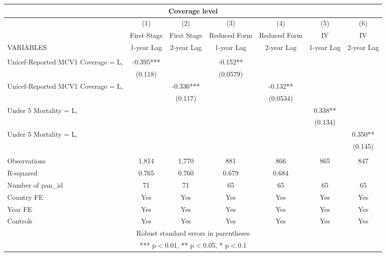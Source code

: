 \documentclass[]{article}
\begin{document}
\begin{tabular}{lcccccc}
\multicolumn{7}{c}{Coverage level} \\ \hline
 & (1) & (2) & (3) & (4) & (5) & (6) \\
 & First Stage & First Stage & Reduced Form & Reduced Form & IV & IV \\
VARIABLES & 1-year Lag & 2-year Lag & 1-year Lag & 2-year Lag & 1-year Lag & 2-year Lag \\ \hline
 &  &  &  &  &  &  \\
Unicef-Reported MCV1 Coverage = L, & -0.395*** &  & -0.152** &  &  &  \\
 & (0.118) &  & (0.0579) &  &  &  \\
Unicef-Reported MCV1 Coverage = L, &  & -0.336*** &  & -0.132** &  &  \\
 &  & (0.117) &  & (0.0534) &  &  \\
Under 5 Mortality = L, &  &  &  &  & 0.338** &  \\
 &  &  &  &  & (0.134) &  \\
Under 5 Mortality = L, &  &  &  &  &  & 0.350** \\
 &  &  &  &  &  & (0.145) \\
 &  &  &  &  &  &  \\
Observations & 1,814 & 1,770 & 881 & 866 & 865 & 847 \\
R-squared & 0.765 & 0.760 & 0.679 & 0.684 &  &  \\
Number of pan\_id & 71 & 71 & 65 & 65 & 65 & 65 \\
Country FE & Yes & Yes & Yes & Yes & Yes & Yes \\
Year FE & Yes & Yes & Yes & Yes & Yes & Yes \\
 Controls & Yes & Yes & Yes & Yes & Yes & Yes \\ \hline
\multicolumn{7}{c}{ Robust standard errors in parentheses} \\
\multicolumn{7}{c}{ *** p$<$0.01, ** p$<$0.05, * p$<$0.1} \\
\end{tabular}
\end{document}
